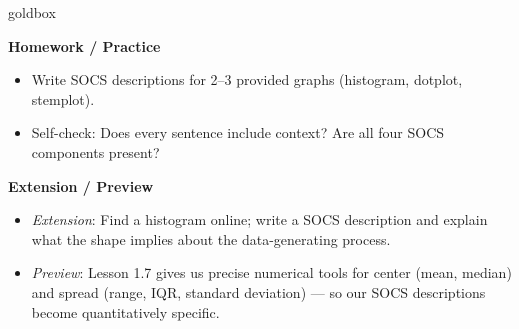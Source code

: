 \documentclass[10pt]{article}
\begin{document}
\begin{skillbox}{goldbox}
\begin{minipage}[t]{0.48\linewidth}
    \textbf{Homework / Practice}
    \begin{itemize}
        \item Write SOCS descriptions for 2--3 provided graphs (histogram, dotplot, stemplot).
        \item Self-check: Does every sentence include context? Are all four SOCS components present?
    \end{itemize}
\end{minipage}
\hfill
\begin{minipage}[t]{0.48\linewidth}
    \textbf{Extension / Preview}
    \begin{itemize}
        \item \textit{Extension}: Find a histogram online; write a SOCS description and explain what the shape implies about the data-generating process.
        \item \textit{Preview}: Lesson 1.7 gives us precise numerical tools for center (mean, median) and spread (range, IQR, standard deviation) --- so our SOCS descriptions become quantitatively specific.
    \end{itemize}
\end{minipage}
\end{skillbox}
\end{document}
